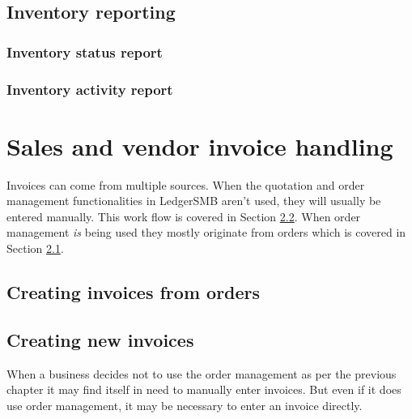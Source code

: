 \section{Inventory reporting}
\label{sec-business-processes-inventory-reporting}

\subsection{Inventory status report}
\label{subsec-business-processes-inventory-reporting-status}

\subsection{Inventory activity report}
\label{subsec-business-processes-inventory-reporting-activity}




\chapter{Sales and vendor invoice handling}
\label{cha-business-processes-invoicing}

Invoices can come from multiple sources. When the quotation and order
management functionalities in LedgerSMB aren't used, they will usually
be entered manually. This work flow is covered in Section
\ref{sec-business-processes-invoicing-manual-entry}.
When order management \emph{is} being used they mostly originate from orders
which is covered in Section \ref{sec-business-processes-invoicing-from-orders}.



\section{Creating invoices from orders}
\label{sec-business-processes-invoicing-from-orders}





\section{Creating new invoices}
\label{sec-business-processes-invoicing-manual-entry}



When a business decides not to use the order management as per the previous
chapter it may find itself in need to manually enter invoices. But even
if it does use order management, it may be necessary to enter an invoice
directly.


